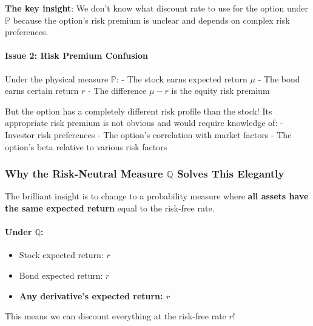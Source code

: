 \documentclass[
  letterpaper,
  DIV=11,
  numbers=noendperiod]{scrartcl}
\let\oldparagraph\paragraph
\renewcommand{\paragraph}[1]{\oldparagraph{#1}\mbox{}}
\providecommand{\tightlist}{%
  \setlength{\itemsep}{0pt}\setlength{\parskip}{0pt}}\usepackage{longtable,booktabs,array}
\begin{document}
\begin{tcolorbox}
\textbf{The key insight}: We don't know what discount rate to use for
the option under \(\mathbb{P}\) because the option's risk premium is
unclear and depends on complex risk preferences.

\hypertarget{issue-2-risk-premium-confusion}{%
\paragraph{Issue 2: Risk Premium
Confusion}\label{issue-2-risk-premium-confusion}}

Under the physical measure \(\mathbb{P}\): - The stock earns expected
return \(\mu\) - The bond earns certain return \(r\) - The difference
\(\mu - r\) is the equity risk premium

But the option has a completely different risk profile than the stock!
Its appropriate risk premium is not obvious and would require knowledge
of: - Investor risk preferences - The option's correlation with market
factors - The option's beta relative to various risk factors

\hypertarget{why-the-risk-neutral-measure-mathbbq-solves-this-elegantly}{%
\subsubsection{\texorpdfstring{Why the Risk-Neutral Measure
\(\mathbb{Q}\) Solves This
Elegantly}{Why the Risk-Neutral Measure \textbackslash mathbb\{Q\} Solves This Elegantly}}\label{why-the-risk-neutral-measure-mathbbq-solves-this-elegantly}}

The brilliant insight is to change to a probability measure where
\textbf{all assets have the same expected return} equal to the risk-free
rate.

\hypertarget{under-mathbbq}{%
\paragraph{\texorpdfstring{Under
\(\mathbb{Q}\):}{Under \textbackslash mathbb\{Q\}:}}\label{under-mathbbq}}

\begin{itemize}
\tightlist
\item
  Stock expected return: \(r\)
\item
  Bond expected return: \(r\)
\item
  \textbf{Any derivative's expected return: \(r\)}
\end{itemize}

This means we can discount everything at the risk-free rate \(r\)!


\end{tcolorbox}
\end{document}
